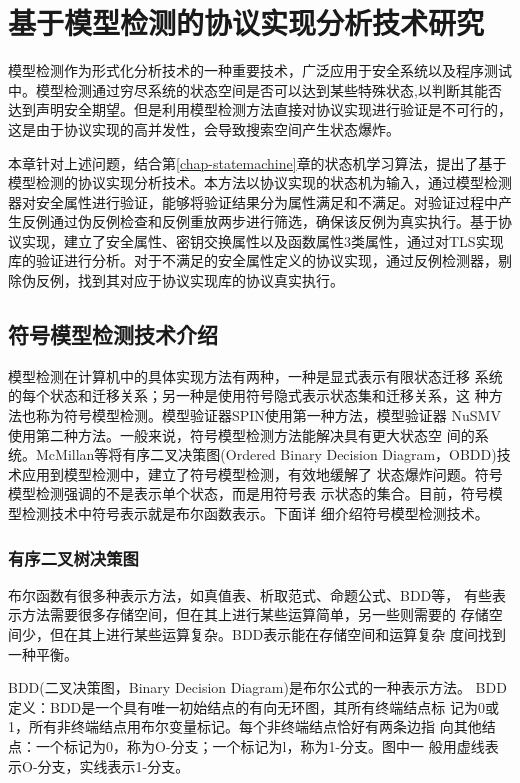 \chapter{基于模型检测的协议实现分析技术研究}

模型检测作为形式化分析技术的一种重要技术，广泛应用于安全系统以及程序测试中。模型检测通过穷尽系统的状态空间是否可以达到某些特殊状态,以判断其能否达到声明安全期望。但是利用模型检测方法直接对协议实现进行验证是不可行的\cite{jhala2009software}，这是由于协议实现的高并发性，会导致搜索空间产生状态爆炸。


本章针对上述问题，结合第\ref{chap-statemachine}章的状态机学习算法，提出了基于模型检测的协议实现分析技术。本方法以协议实现的状态机为输入，通过模型检测器对安全属性进行验证，能够将验证结果分为属性满足和不满足。对验证过程中产生反例通过伪反例检查和反例重放两步进行筛选，确保该反例为真实执行。基于协议实现，建立了安全属性、密钥交换属性以及函数属性3类属性，通过对TLS实现库的验证进行分析。对于不满足的安全属性定义的协议实现，通过反例检测器，剔除伪反例，找到其对应于协议实现库的协议真实执行。


\section{符号模型检测技术介绍}

模型检测在计算机中的具体实现方法有两种，一种是显式表示有限状态迁移
系统的每个状态和迁移关系；另一种是使用符号隐式表示状态集和迁移关系，这
种方法也称为符号模型检测。模型验证器SPIN使用第一种方法，模型验证器
NuSMV使用第二种方法。一般来说，符号模型检测方法能解决具有更大状态空
间的系统。McMillan等将有序二叉决策图(Ordered Binary
Decision Diagram，OBDD)技术应用到模型检测中，建立了符号模型检测，有效地缓解了
状态爆炸问题\cite{Miller1990}。符号模型检测强调的不是表示单个状态，而是用符号表
示状态的集合。目前，符号模型检测技术中符号表示就是布尔函数表示。下面详
细介绍符号模型检测技术。

\subsection{有序二叉树决策图}

布尔函数有很多种表示方法，如真值表、析取范式、命题公式、BDD等，
有些表示方法需要很多存储空间，但在其上进行某些运算简单，另一些则需要的
存储空间少，但在其上进行某些运算复杂。BDD表示能在存储空间和运算复杂
度间找到一种平衡。

BDD(二叉决策图，Binary Decision Diagram)是布尔公式的一种表示方法。
BDD定义：BDD是一个具有唯一初始结点的有向无环图，其所有终端结点标
记为0或1，所有非终端结点用布尔变量标记。每个非终端结点恰好有两条边指
向其他结点：一个标记为0，称为O-分支；一个标记为l，称为1-分支。图中一
般用虚线表示O-分支，实线表示1-分支。


